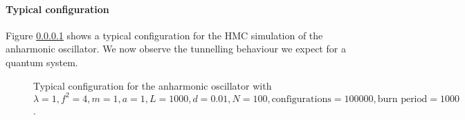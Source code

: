 \documentclass[12pt]{article}
\begin{document}
            \paragraph{Typical configuration}
                Figure \ref{} shows a typical configuration for the HMC simulation of the anharmonic oscillator. We now observe the tunnelling behaviour we expect for a quantum system.
                \begin{figure}
                    \centering
                    \caption{Typical configuration for the anharmonic oscillator with $\lambda = 1, f^2 = 4, m = 1, a = 1, L = 1000, d = 0.01, N = 100, \text{configurations} = 100000, \text{burn period} = 1000$.}
                    \label{fig:TypicalAnharmonicTrajectory}
                \end{figure}
\end{document}
